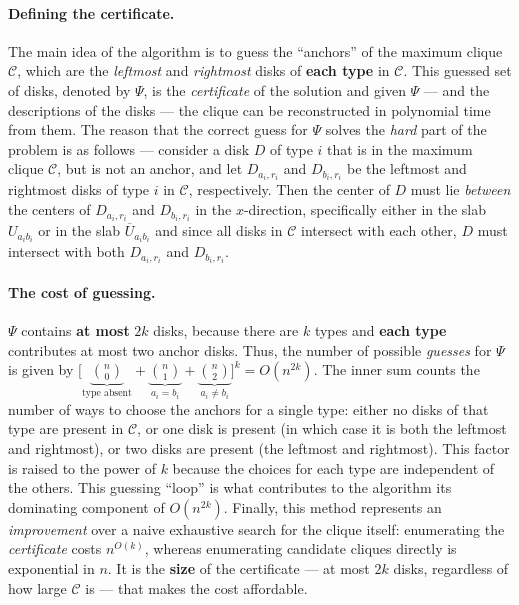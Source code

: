 \documentclass[12pt]{article}
\begin{document}
\paragraph{Defining the certificate.}
The main idea of the algorithm is to guess the ``anchors'' of the maximum clique $\mathcal{C}$, which are the \textit{leftmost} and \textit{rightmost} disks of \textbf{each type} in $\mathcal{C}$.
This guessed set of disks, denoted by $\Psi$, is the \textit{certificate} of the solution and given $\Psi$ --- and the descriptions of the disks --- the clique can be reconstructed in polynomial time from them.
The reason that the correct guess for $\Psi$ solves the \textit{hard} part of the problem is as follows ---
consider a disk $D$ of type $i$ that is in the maximum clique $\mathcal{C}$, but is not an anchor, and let $D_{a_i,r_i}$ and $D_{b_i,r_i}$ be the leftmost and rightmost disks of type $i$ in $\mathcal{C}$, respectively.
Then the center of $D$ must lie \textit{between} the centers of $D_{a_i,r_i}$ and $D_{b_i,r_i}$ in the $x$-direction, specifically either in the slab $U_{a_ib_i}$ or in the slab $\overline{U}_{a_ib_i}$
and since all disks in $\mathcal{C}$ intersect with each other, $D$ must intersect with both $D_{a_i,r_i}$ and $D_{b_i,r_i}$.

\paragraph{The cost of guessing.}
$\Psi$ contains \textbf{at most} $2k$ disks, because there are $k$ types and \textbf{each type} contributes at most two anchor disks.
Thus, the number of possible \textit{guesses} for $\Psi$ is given by $\bigg[\underbrace{\binom{n}{0}}_{\text{type absent}} + \underbrace{\binom{n}{1}}_{a_i = b_i} + \underbrace{\binom{n}{2}}_{a_i \ne b_i} \bigg]^k = O(n^{2k})$.
The inner sum counts the number of ways to choose the anchors for a single type: either no disks of that type are present in $\mathcal{C}$, or one disk is present (in which case it is both the leftmost and rightmost), or two disks are present (the leftmost and rightmost).
This factor is raised to the power of $k$ because the choices for each type are independent of the others.
This guessing ``loop'' is what contributes to the algorithm its dominating component of $O(n^{2k})$.
Finally, this method represents an \textit{improvement} over a naive exhaustive search for the clique itself:
enumerating the \textit{certificate} costs $n^{O(k)}$, whereas enumerating candidate cliques directly is exponential in $n$.
It is the \textbf{size} of the certificate --- at most $2k$ disks, regardless of how large $\mathcal{C}$ is --- that makes the cost affordable.
\end{document}
